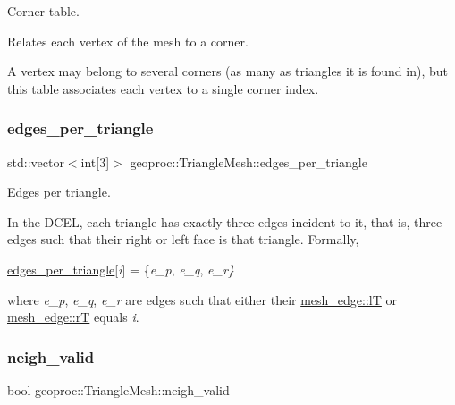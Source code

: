 Corner table. 

Relates each vertex of the mesh to a corner.

A vertex may belong to several corners (as many as triangles it is found in), but this table associates each vertex to a single corner index. \mbox{\label{classgeoproc_1_1TriangleMesh_ad72cdd2358e815a09c07176730b4e0a5}} 
\subsubsection{\texorpdfstring{edges\+\_\+per\+\_\+triangle}{edges\_per\_triangle}}
{\footnotesize\ttfamily std\+::vector$<$int\mbox{[}3\mbox{]}$>$ geoproc\+::\+Triangle\+Mesh\+::edges\+\_\+per\+\_\+triangle\hspace{0.3cm}{\ttfamily [protected]}}



Edges per triangle. 

In the D\+C\+EL, each triangle has exactly three edges incident to it, that is, three edges such that their right or left face is that triangle. Formally,

\hyperlink{classgeoproc_1_1TriangleMesh_ad72cdd2358e815a09c07176730b4e0a5}{edges\+\_\+per\+\_\+triangle}\mbox{[}{\itshape i}\mbox{]} = \{{\itshape e\+\_\+p}, {\itshape e\+\_\+q}, {\itshape e\+\_\+r\}} 

where {\itshape e\+\_\+p}, {\itshape e\+\_\+q}, {\itshape e\+\_\+r} are edges such that either their \hyperlink{classgeoproc_1_1mesh__edge_a348d06b420ce1588be1bc7eac781c6ef}{mesh\+\_\+edge\+::lT} or \hyperlink{classgeoproc_1_1mesh__edge_af19f02d3f6c36f2b23afa581c8ae3f59}{mesh\+\_\+edge\+::rT} equals {\itshape i}. \mbox{\label{classgeoproc_1_1TriangleMesh_a21205ec88e494f864db4d8247db70d3c}} 
\subsubsection{\texorpdfstring{neigh\+\_\+valid}{neigh\_valid}}
{\footnotesize\ttfamily bool geoproc\+::\+Triangle\+Mesh\+::neigh\+\_\+valid\hspace{0.3cm}{\ttfamily [protected]}}



